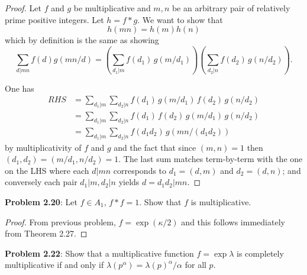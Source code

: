 \documentclass{article}
\begin{document}
\begin{proof}
Let $f$ and $g$ be multiplicative and $m, n$ be an arbitrary pair of relatively prime positive integers. Let $h = f * g$. We want to show that
$$h(mn) = h(m) h(n)$$
which by definition is the same as showing
$$\sum_{d | mn} f(d) g(mn/d) = \left( \sum_{d_1 | m} f(d_1) \, g(m/d_1) \right) \left( \sum_{d_2 | n} f(d_2) \, g(n/d_2) \right).$$

One has
\begin{align*}
RHS &= \sum_{d_1 | m} \sum_{d_2 | n} f(d_1) \, g(m/d_1) \, f(d_2) \, g(n/d_2)\\
&= \sum_{d_1 | m} \sum_{d_2 | n} f(d_1) \, f(d_2) \, g(m/d_1) \, g(n/d_2)\\
&= \sum_{d_1 | m} \sum_{d_2 | n} f(d_1 d_2) \, g(mn/(d_1d_2))
\end{align*}
by multiplicativity of $f$ and $g$ and the fact that since $(m, n) = 1$ then $(d_1, d_2) = (m/d_1, n/d_2) = 1$. The last sum matches term-by-term with the one on the LHS where each $d | mn$ corresponds to $d_1 = (d,m)$ and $d_2 = (d,n)$; and conversely each pair $d_1 | m, d_2 | n$ yields $d = d_1 d_2 | mn$.
\end{proof}


\textbf{Problem 2.20}: Let $f \in A_1$, $f * f = 1$. Show that $f$ is multiplicative.

\begin{proof}
From previous problem, $f = \exp(\kappa/2)$ and this follows immediately from Theorem 2.27.
\end{proof}

\textbf{Problem 2.22}: Show that a multiplicative function $f = \exp \lambda$ is completely multiplicative if and only if $\lambda(p^\alpha) = \lambda(p)^\alpha / \alpha$ for all $p$.
\end{document}
